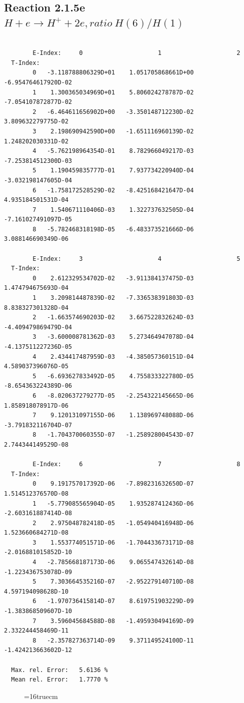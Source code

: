 \documentclass[12pt,dvips]{article}
\begin{document}
\newpage
\subsection{
Reaction 2.1.5e  $H + e \rightarrow H^+ + 2e, ratio~ H(6)/H(1)$
}


\begin{small}\begin{verbatim}

        E-Index:     0                     1                     2
  T-Index:
        0   -3.118788806329D+01    1.051705868661D+00   -6.954764617920D-02
        1    1.300365034969D+01    5.806024278787D-02   -7.054107872877D-02
        2   -6.464611656902D+00   -3.350148712230D-02    3.809632279775D-02
        3    2.198690942590D+00   -1.651116960139D-02    1.248202030331D-02
        4   -5.762198964354D-01    8.782966049217D-03   -7.253814512300D-03
        5    1.190459835777D-01    7.937734220940D-04   -3.032198147605D-04
        6   -1.758172528529D-02   -8.425168421647D-04    4.935184501531D-04
        7    1.540671110406D-03    1.322737632505D-04   -7.161027491097D-05
        8   -5.782468318198D-05   -6.483373521666D-06    3.088146690349D-06

        E-Index:     3                     4                     5
  T-Index:
        0    2.612329534702D-02   -3.911384137475D-03    1.474794675693D-04
        1    3.209814487839D-02   -7.336538391803D-03    8.838327301328D-04
        2   -1.663574690203D-02    3.667522832624D-03   -4.409479869479D-04
        3   -3.600008781362D-03    5.273464947078D-04   -4.137511227236D-05
        4    2.434417487959D-03   -4.385057360151D-04    4.589037396076D-05
        5   -6.693627833492D-05    4.755833322780D-05   -8.654363224389D-06
        6   -8.020637279277D-05   -2.254322145665D-06    1.858918078917D-06
        7    9.120131097155D-06    1.138969748088D-06   -3.791832116704D-07
        8   -1.704370060355D-07   -1.258928004543D-07    2.744344149529D-08

        E-Index:     6                     7                     8
  T-Index:
        0    9.191757017392D-06   -7.898231632650D-07    1.514512376570D-08
        1   -5.779085565904D-05    1.935287412436D-06   -2.603161887414D-08
        2    2.975048782418D-05   -1.054940416948D-06    1.523660684271D-08
        3    1.553774051571D-06   -1.704433673171D-08   -2.016881015852D-10
        4   -2.785668187173D-06    9.065547432614D-08   -1.223436753078D-09
        5    7.303664535216D-07   -2.952279140710D-08    4.597194098628D-10
        6   -1.970736415814D-07    8.619751903229D-09   -1.383868509607D-10
        7    3.596045684588D-08   -1.495930494169D-09    2.332244458469D-11
        8   -2.357827363714D-09    9.371149524100D-11   -1.424213663602D-12

  Max. rel. Error:   5.6136 %
  Mean rel. Error:   1.7770 %

\end{verbatim}\end{small}
\begin{figure} \label{2.1.5e}
\epsfxsize=16truecm
\end{figure}
\end{document}
